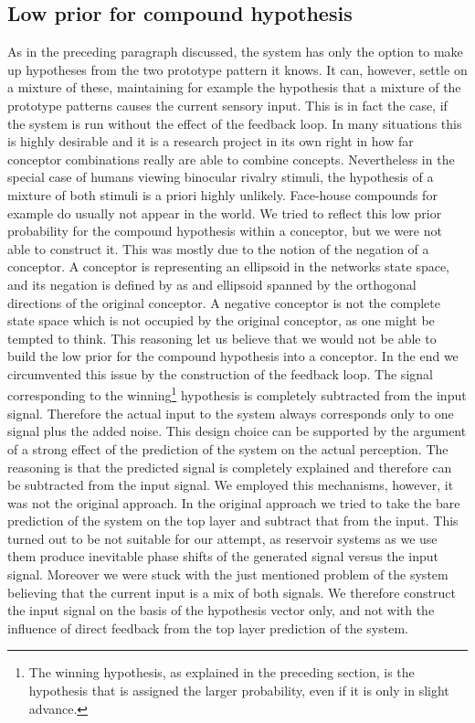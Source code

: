 \documentclass{frontiersSCNS} %
\begin{document}
	\subsection{Low prior for compound hypothesis}
 	As in the preceding paragraph discussed, the system has only the option to make up hypotheses from the two prototype pattern it knows. It can, however, settle on a mixture of these, maintaining for example the hypothesis that a mixture of the prototype patterns causes the current sensory input. This is in fact the case, if the system is run without the effect of the feedback loop. In many situations this is highly desirable and it is a research project in its own right in how far conceptor combinations really are able to combine concepts. Nevertheless in the special case of humans viewing binocular rivalry stimuli, the hypothesis of a mixture of both stimuli is a priori highly unlikely. Face-house compounds for example do usually not appear in the world. We tried to reflect this low prior probability for the compound hypothesis within a conceptor, but we were not able to construct it. This was mostly due to the notion of the negation of a conceptor. A conceptor is representing an ellipsoid in the networks state space, and its negation is defined by  \cite{Jaeger2014}  as and ellipsoid spanned by the orthogonal directions of the original conceptor. A negative conceptor is not the complete state space which is not occupied by the original conceptor, as one might be tempted to think. This reasoning let us believe that we would not be able to build the low prior for the compound hypothesis into a conceptor. In the end we circumvented this issue by the construction of the feedback loop. The signal corresponding to the winning\footnote{The winning hypothesis, as explained in the preceding section, is the hypothesis that is assigned the larger probability, even if it is only in slight advance.  } hypothesis is completely subtracted from the input signal. Therefore the actual input to the system always corresponds only to one signal plus the added noise. This design choice can be supported by the argument of a strong effect of the prediction of the system on the actual perception. The reasoning is that the predicted signal is completely explained and therefore can be subtracted from the input signal. We employed this mechanisms, however, it was not the original approach. In the original approach we tried to take the bare prediction of the system on the top layer and subtract that from the input. This turned out to be not suitable for our attempt, as reservoir systems as we use them produce inevitable phase shifts of the generated signal versus the input signal. Moreover we were stuck with the just mentioned problem of the system believing that the current input is a mix of both signals. We therefore construct the input signal on the basis of the hypothesis vector only, and not with the influence of direct feedback from the top layer prediction of the system.  
      
\end{document}

